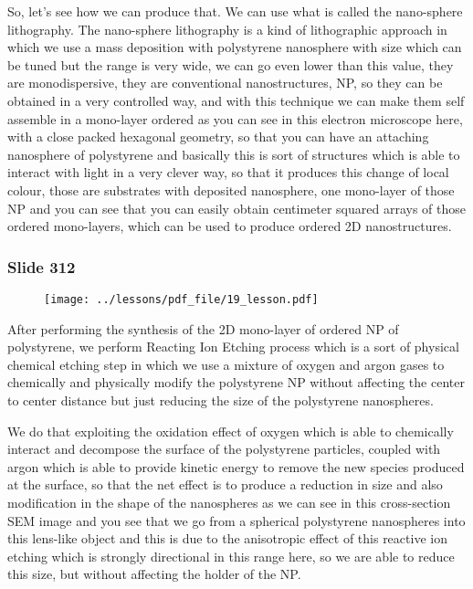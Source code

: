 \documentclass[../main/main.tex]{subfiles}
\begin{document}
So, let's see how we can produce that. We can use what is called the nano-sphere lithography. The nano-sphere lithography is a kind of lithographic approach in which we use a mass deposition with polystyrene nanosphere with size which can be tuned but the range is very wide, we can go even lower than this value, they are monodispersive, they are conventional nanostructures, NP, so they can be obtained in a very controlled way, and with this technique we can make them self assemble in a mono-layer ordered as you can see in this electron microscope here, with a close packed hexagonal geometry, so that you can have an attaching nanosphere of polystyrene and basically this is sort of structures which is able to interact with light in a very clever way, so that it produces this change of local colour, those are substrates with deposited nanosphere, one mono-layer of those NP and you can see that you can easily obtain centimeter squared arrays of those ordered mono-layers, which can be used to produce ordered 2D nanostructures.

\newpage

\subsubsection{Slide 312}

\begin{figure}[h!]
\centering
\texttt{[image: ../lessons/pdf\_file/19\_lesson.pdf]}
\end{figure}

After performing the synthesis of the 2D mono-layer of ordered NP of polystyrene, we perform Reacting Ion Etching process which is a sort of physical chemical etching step in which we use a mixture of oxygen and argon gases to chemically and physically modify the polystyrene NP without affecting the center to center distance but just reducing the size of the polystyrene nanospheres.

We do that exploiting the oxidation effect of oxygen which is able to chemically interact and decompose the surface of the polystyrene particles, coupled with argon which is able to provide kinetic energy to remove the new species produced at the surface, so that the net effect is to produce a reduction in size and also modification in the shape of the nanospheres as we can see in this cross-section SEM image and you see that we go from a spherical polystyrene nanospheres into this lens-like object and this is due to the anisotropic effect of this reactive ion etching which is strongly directional in this range here, so we are able to reduce this size, but without affecting the holder of the NP.
\end{document}
